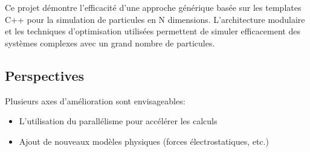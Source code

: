 \documentclass[12pt,a4paper]{article}
\begin{document}
Ce projet démontre l'efficacité d'une approche générique basée sur les templates C++ pour la simulation de particules en N dimensions. L'architecture modulaire et les techniques d'optimisation utilisées permettent de simuler efficacement des systèmes complexes avec un grand nombre de particules.

\subsection{Perspectives}

Plusieurs axes d'amélioration sont envisageables:

\begin{itemize}
    \item L'utilisation du parallélisme pour accélérer les calculs
    \item Ajout de nouveaux modèles physiques (forces électrostatiques, etc.)
\end{itemize}
\end{document}
